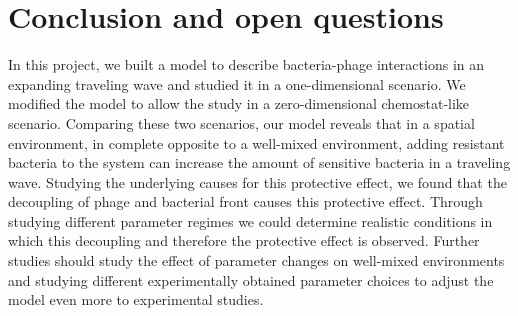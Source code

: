 \chapter{Conclusion and open questions}
\label{chap:conclusion}

In this project, we built a model to describe bacteria-phage interactions in an expanding traveling wave and studied it in a one-dimensional scenario. We modified the model to allow the study in a zero-dimensional chemostat-like scenario. 
Comparing these two scenarios, our model reveals that in a spatial environment, in complete opposite to a well-mixed environment, adding resistant bacteria to the system can increase the amount of sensitive bacteria in a traveling wave.
Studying the underlying causes for this protective effect, we found that the decoupling of phage and bacterial front causes this protective effect. Through studying different parameter regimes we could determine realistic conditions in which this decoupling and therefore the protective effect is observed.
Further studies should study the effect of parameter changes on well-mixed environments and studying different experimentally obtained parameter choices to adjust the model even more to experimental studies.









